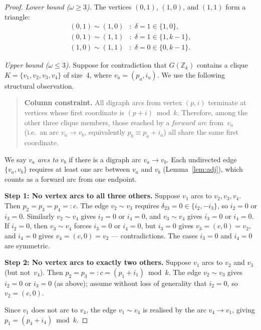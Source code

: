 \documentclass[12pt]{article}
\theoremstyle{definition}
\theoremstyle{remark}
\newcommand{\Z}{\mathbb{Z}}
\newcommand{\GZk}{G(\Z_k)}
\begin{document}
\begin{proof}
\emph{Lower bound ($\omega \ge 3$).}
The vertices $(0,1)$, $(1,0)$, and $(1,1)$ form a triangle:
\begin{align*}
  (0,1) \sim (1,0) &:\; \delta = 1 \in \{1, 0\}, \\
  (0,1) \sim (1,1) &:\; \delta = 1 \in \{1, k{-}1\}, \\
  (1,0) \sim (1,1) &:\; \delta = 0 \in \{0, k{-}1\}.
\end{align*}

\smallskip
\emph{Upper bound ($\omega \le 3$).}
Suppose for contradiction that $\GZk$ contains a clique
$K = \{v_1, v_2, v_3, v_4\}$ of size~$4$, where $v_a = (p_a, i_a)$.
We use the following structural observation.

\begin{quote}
\textbf{Column constraint.}  All digraph arcs from vertex $(p,i)$
terminate at vertices whose first coordinate is $(p + i) \bmod k$.
Therefore, among the other three clique members, those reached by a
\emph{forward arc} from~$v_a$ (i.e.\ an arc $v_a \to v_b$, equivalently
$p_b \equiv p_a + i_a$) all share the same first coordinate.
\end{quote}

We say $v_a$ \emph{arcs to} $v_b$ if there is a digraph arc $v_a \to v_b$.
Each undirected edge $\{v_a, v_b\}$ requires at least one arc between
$v_a$ and $v_b$ (Lemma~\ref{lem:adj}), which counts as a forward arc
from one endpoint.

\smallskip\noindent
\textbf{Step 1: No vertex arcs to all three others.}
Suppose $v_1$ arcs to $v_2, v_3, v_4$.  Then $p_2 = p_3 = p_4 =: c$.
The edge $v_2 \sim v_3$ requires $\delta_{23} = 0 \in \{i_2, -i_3\}$,
so $i_2 = 0$ or $i_3 = 0$.  Similarly $v_2 \sim v_4$ gives $i_2 = 0$ or
$i_4 = 0$, and $v_3 \sim v_4$ gives $i_3 = 0$ or $i_4 = 0$.
If $i_2 = 0$, then $v_3 \sim v_4$ forces $i_3 = 0$ or $i_4 = 0$, but
$i_3 = 0$ gives $v_3 = (c, 0) = v_2$, and $i_4 = 0$ gives
$v_4 = (c, 0) = v_2$ --- contradictions.
The cases $i_3 = 0$ and $i_4 = 0$ are symmetric.

\smallskip\noindent
\textbf{Step 2: No vertex arcs to exactly two others.}
Suppose $v_1$ arcs to $v_2$ and $v_3$ (but not~$v_4$).
Then $p_2 = p_3 =: c = (p_1 + i_1) \bmod k$.  The edge $v_2 \sim v_3$
gives $i_2 = 0$ or $i_3 = 0$ (as above); assume without loss of generality that
$i_2 = 0$, so $v_2 = (c, 0)$.

Since $v_1$ does not arc to $v_4$, the edge $v_1 \sim v_4$ is realised by
the arc $v_4 \to v_1$, giving $p_1 = (p_4 + i_4) \bmod k$.


\end{proof}
\end{document}
